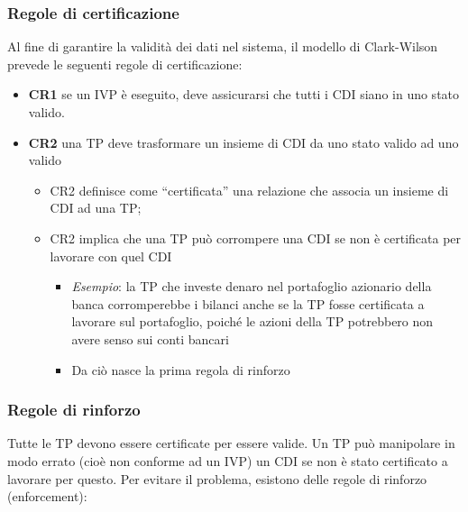 \subsubsection{Regole di certificazione}
Al fine di garantire la validità dei dati nel sistema, il modello di
Clark-Wilson prevede le seguenti
regole di certificazione:
\begin{itemize}
      \item \textbf{CR1} se un IVP è eseguito, deve assicurarsi che tutti i CDI
            siano in uno stato valido.
      \item \textbf{CR2} una TP deve trasformare un insieme di CDI da uno stato
            valido ad uno valido
            \begin{itemize}
                  \item CR2 definisce come “certificata” una relazione che
                        associa un insieme di CDI ad
                        una TP;
                  \item CR2 implica che una TP può corrompere una CDI se non è
                        certificata per lavorare
                        con quel CDI
                        \begin{itemize}
                              \item \textit{Esempio}: la TP che investe denaro nel
                                    portafoglio azionario della banca
                                    corromperebbe i bilanci anche se la TP
                                    fosse certificata a lavorare sul
                                    portafoglio, poiché le azioni della TP
                                    potrebbero non avere senso sui conti
                                    bancari
                              \item Da ciò nasce la prima regola di rinforzo
                        \end{itemize}
            \end{itemize}
\end{itemize}

\subsubsection{Regole di rinforzo}

Tutte le TP devono essere certificate per essere valide.
Un TP può manipolare in modo errato (cioè non conforme ad un IVP) un CDI se
non è stato
certificato a lavorare per questo. Per evitare il problema, esistono delle
regole di rinforzo
(enforcement):

